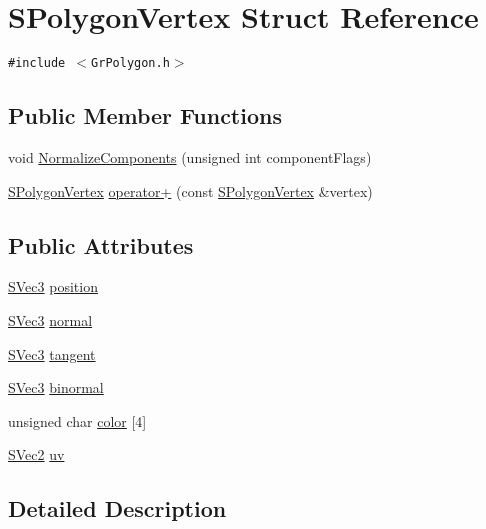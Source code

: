 \hypertarget{struct_s_polygon_vertex}{
\section{SPolygonVertex Struct Reference}
\label{struct_s_polygon_vertex}
}
{\tt \#include $<$GrPolygon.h$>$}

\subsection*{Public Member Functions}
\begin{CompactItemize}
\item 
void \hyperlink{struct_s_polygon_vertex_1789e2065c5cd01be53c443f7c8b637f}{NormalizeComponents} (unsigned int componentFlags)
\item 
\hyperlink{struct_s_polygon_vertex}{SPolygonVertex} \hyperlink{struct_s_polygon_vertex_22ffa5c491a96f9bd547a4f198ddf68c}{operator+} (const \hyperlink{struct_s_polygon_vertex}{SPolygonVertex} \&vertex)
\end{CompactItemize}
\subsection*{Public Attributes}
\begin{CompactItemize}
\item 
\hyperlink{struct_s_vec3}{SVec3} \hyperlink{struct_s_polygon_vertex_522e1e97ae3be47d4ea6d424773fc569}{position}
\item 
\hyperlink{struct_s_vec3}{SVec3} \hyperlink{struct_s_polygon_vertex_107117b51a3b3ca1863396cf8333ca1d}{normal}
\item 
\hyperlink{struct_s_vec3}{SVec3} \hyperlink{struct_s_polygon_vertex_3ef855ac9b84b59cbbed657520d9c7fd}{tangent}
\item 
\hyperlink{struct_s_vec3}{SVec3} \hyperlink{struct_s_polygon_vertex_ac8e96e25997ee7f5460b5af7e19f5ff}{binormal}
\item 
unsigned char \hyperlink{struct_s_polygon_vertex_78c196bc8cb7d1b64630d59d4df5acb5}{color} \mbox{[}4\mbox{]}
\item 
\hyperlink{struct_s_vec2}{SVec2} \hyperlink{struct_s_polygon_vertex_022e87802986b84acbdae9c27e689c12}{uv}
\end{CompactItemize}


\subsection{Detailed Description}


